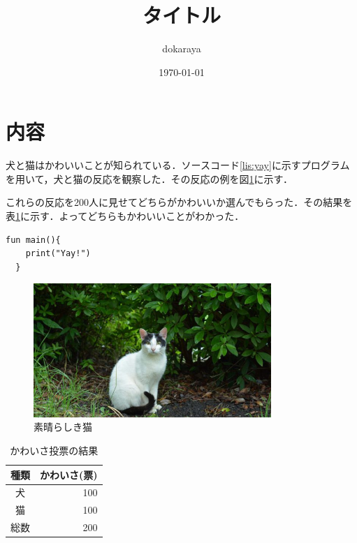 \documentclass[a4j,10pt]{jarticle}
\title{タイトル}
\author{dokaraya}
\date{\today}
\begin{document}
	\maketitle
  \section{内容}
  犬と猫はかわいいことが知られている．ソースコード\ref{lis:yay}に示すプログラムを用いて，犬と猫の反応を観察した．その反応の例を図\ref{fig:cat}に示す．\par
  これらの反応を200人に見せてどちらがかわいいか選んでもらった．その結果を表\ref{tab:example}に示す．よってどちらもかわいいことがわかった．

  \begin{lstlisting}[caption = Yayするプログラム, label = lis:yay]
  fun main(){
    print("Yay!")
  }
  \end{lstlisting}

  \begin{figure}
    \centering
    \includegraphics[width=9cm]{fig/img.jpg}
    \caption{素晴らしき猫}
    \label{fig:cat}
  \end{figure}

  \begin{table}[t]
    \caption{かわいさ投票の結果}
    \label{tab:example}
    \centering
    \begin{tabular}{cr}
      \hline
      種類 & かわいさ(票)\\ \hline
      犬 & 100\\
      猫 & 100\\ \hline
      総数 & 200 \\ \hline
    \end{tabular}
  \end{table}
\end{document}
